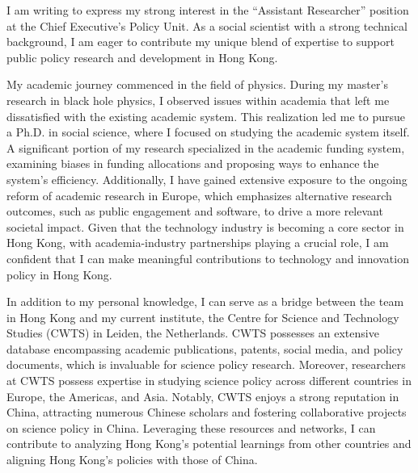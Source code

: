 \documentclass[11pt, a4paper]{awesome-cv}
\begin{document}
\makecvheader[R]

\makecvfooter
  {}%
  {}%
  {}

\makelettertitle

\begin{cvletter}



I am writing to express my strong interest in the ``Assistant Researcher'' position at the Chief Executive's Policy Unit. As a social scientist with a strong technical background, I am eager to contribute my unique blend of expertise to support public policy research and development in Hong Kong.

My academic journey commenced in the field of physics. During my master's research in black hole physics, I observed issues within academia that left me dissatisfied with the existing academic system. This realization led me to pursue a Ph.D. in social science, where I focused on studying the academic system itself. A significant portion of my research specialized in the academic funding system, examining biases in funding allocations and proposing ways to enhance the system's efficiency. Additionally, I have gained extensive exposure to the ongoing reform of academic research in Europe, which emphasizes alternative research outcomes, such as public engagement and software, to drive a more relevant societal impact. Given that the technology industry is becoming a core sector in Hong Kong, with academia-industry partnerships playing a crucial role, I am confident that I can make meaningful contributions to technology and innovation policy in Hong Kong.

In addition to my personal knowledge, I can serve as a bridge between the team in Hong Kong and my current institute, the Centre for Science and Technology Studies (CWTS) in Leiden, the Netherlands. CWTS possesses an extensive database encompassing academic publications, patents, social media, and policy documents, which is invaluable for science policy research. Moreover, researchers at CWTS possess expertise in studying science policy across different countries in Europe, the Americas, and Asia. Notably, CWTS enjoys a strong reputation in China, attracting numerous Chinese scholars and fostering collaborative projects on science policy in China. Leveraging these resources and networks, I can contribute to analyzing Hong Kong's potential learnings from other countries and aligning Hong Kong's policies with those of China.


\end{cvletter}
\end{document}
